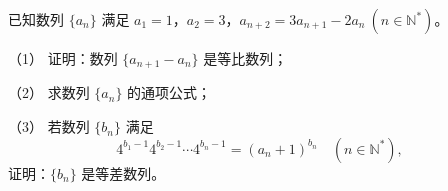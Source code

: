 \begin{question}
已知数列 $\{a_n\}$ 满足 $a_1=1$，$a_2=3$，$a_{n+2}=3a_{n+1}-2a_n\ (n\in\mathbb{N}^*)$。

（1） 证明：数列 $\{a_{n+1}-a_n\}$ 是等比数列；

（2） 求数列 $\{a_n\}$ 的通项公式；

（3） 若数列 $\{b_n\}$ 满足
\nopagebreak[4]
\[
4^{b_1-1}4^{b_2-1}\cdots 4^{b_n-1}=(a_n+1)^{b_n}\quad(n\in\mathbb{N}^*),
\]
证明：$\{b_n\}$ 是等差数列。

\end{question}